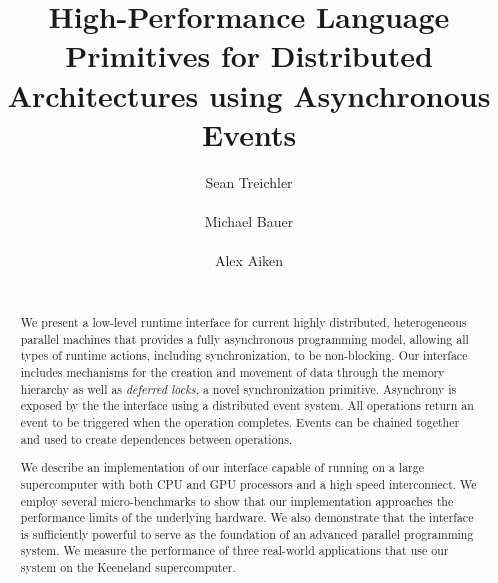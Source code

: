\documentclass{sig-alternate}
\begin{document}
\title{High-Performance Language Primitives for Distributed Architectures using Asynchronous Events}
\author{
\alignauthor Sean Treichler\\
              \\
\alignauthor Michael Bauer \\
              \\
\alignauthor Alex Aiken \\
              \\
}
\maketitle

\begin{abstract}
We present a low-level runtime interface for current highly distributed, heterogeneous
parallel machines that provides a fully asynchronous 
programming model, allowing all types of runtime actions, including synchronization,
to be non-blocking.  Our interface includes mechanisms for the creation and movement
of data through the memory hierarchy as well as {\em deferred locks}, a novel synchronization primitive.
Asynchrony is exposed by the the interface using a distributed event system.  All
operations return an event to be triggered when the operation completes.  Events
can be chained together and used to create dependences between operations.

We describe an implementation of our interface capable of running on
a large supercomputer with both CPU and GPU processors and a high speed interconnect.
We employ several micro-benchmarks to show that our implementation approaches
the performance limits of the underlying hardware.
We also demonstrate that the interface is sufficiently powerful to serve as the foundation 
of an advanced parallel programming system.  We measure the performance of three real-world applications
that use our system on the Keeneland supercomputer.
\end{abstract}

%









{
\small


}
\end{document}
